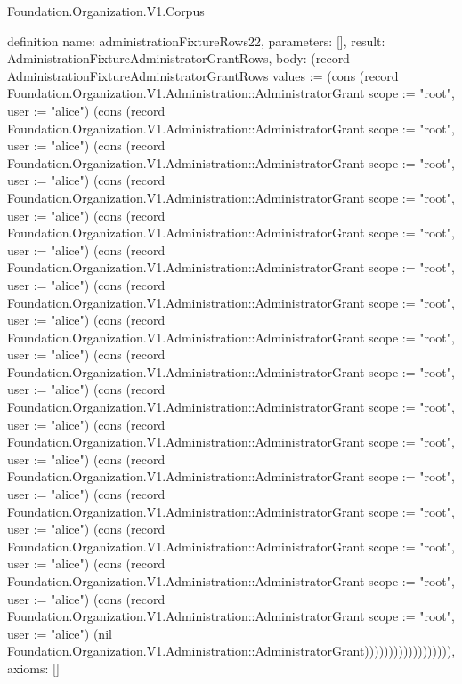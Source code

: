 \begin{lexlean}{Foundation.Organization.V1.Corpus}
\begin{semanticmodule}
definition{
  name: administrationFixtureRows22,
  parameters: [],
  result: AdministrationFixtureAdministratorGrantRows,
  body: (record AdministrationFixtureAdministratorGrantRows {values := (cons (record Foundation.Organization.V1.Administration::AdministratorGrant {scope := "root", user := "alice"}) (cons (record Foundation.Organization.V1.Administration::AdministratorGrant {scope := "root", user := "alice"}) (cons (record Foundation.Organization.V1.Administration::AdministratorGrant {scope := "root", user := "alice"}) (cons (record Foundation.Organization.V1.Administration::AdministratorGrant {scope := "root", user := "alice"}) (cons (record Foundation.Organization.V1.Administration::AdministratorGrant {scope := "root", user := "alice"}) (cons (record Foundation.Organization.V1.Administration::AdministratorGrant {scope := "root", user := "alice"}) (cons (record Foundation.Organization.V1.Administration::AdministratorGrant {scope := "root", user := "alice"}) (cons (record Foundation.Organization.V1.Administration::AdministratorGrant {scope := "root", user := "alice"}) (cons (record Foundation.Organization.V1.Administration::AdministratorGrant {scope := "root", user := "alice"}) (cons (record Foundation.Organization.V1.Administration::AdministratorGrant {scope := "root", user := "alice"}) (cons (record Foundation.Organization.V1.Administration::AdministratorGrant {scope := "root", user := "alice"}) (cons (record Foundation.Organization.V1.Administration::AdministratorGrant {scope := "root", user := "alice"}) (cons (record Foundation.Organization.V1.Administration::AdministratorGrant {scope := "root", user := "alice"}) (cons (record Foundation.Organization.V1.Administration::AdministratorGrant {scope := "root", user := "alice"}) (cons (record Foundation.Organization.V1.Administration::AdministratorGrant {scope := "root", user := "alice"}) (cons (record Foundation.Organization.V1.Administration::AdministratorGrant {scope := "root", user := "alice"}) (nil Foundation.Organization.V1.Administration::AdministratorGrant)))))))))))))))))}),
  axioms: []
}


\end{semanticmodule}
\end{lexlean}
